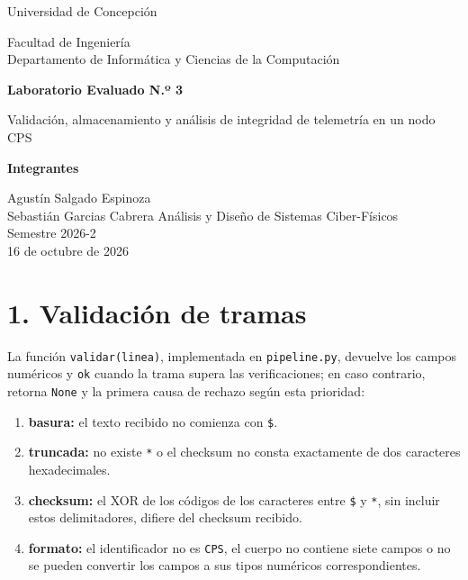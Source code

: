 \documentclass[
  11pt,
]{article}
\author{}
\date{}
\newcommand{\passthrough}[1]{#1}
\providecommand{\tightlist}{%
  \setlength{\itemsep}{0pt}\setlength{\parskip}{0pt}}
\begin{document}
\begin{titlepage}
\centering
{\large Universidad de Concepción\par}
\vspace{0.3cm}
Facultad de Ingeniería\\
Departamento de Informática y Ciencias de la Computación
\vspace{2.8cm}

{\LARGE\bfseries Laboratorio Evaluado N.º 3\par}
\vspace{0.8cm}
{\Large Validación, almacenamiento y análisis de integridad de telemetría en un nodo CPS\par}
\vspace{2.4cm}

{\large\bfseries Integrantes\par}
\vspace{0.4cm}
Agustín Salgado Espinoza\\[0.2cm]
Sebastián Garcias Cabrera
\vfill
Análisis y Diseño de Sistemas Ciber-Físicos\\
Semestre 2026-2\\[0.5cm]
16 de octubre de 2026
\end{titlepage}
\setcounter{page}{1}

\hypertarget{validaciuxf3n-de-tramas}{%
\section{1. Validación de tramas}\label{validaciuxf3n-de-tramas}}

La función \passthrough{\lstinline!validar(linea)!}, implementada en
\passthrough{\lstinline!pipeline.py!}, devuelve los campos numéricos y
\passthrough{\lstinline!ok!} cuando la trama supera las verificaciones;
en caso contrario, retorna \passthrough{\lstinline!None!} y la primera
causa de rechazo según esta prioridad:

\begin{enumerate}
\def\labelenumi{\arabic{enumi}.}
\tightlist
\item
  \textbf{basura:} el texto recibido no comienza con
  \passthrough{\lstinline!$!}.
\item
  \textbf{truncada:} no existe \passthrough{\lstinline!*!} o el checksum
  no consta exactamente de dos caracteres hexadecimales.
\item
  \textbf{checksum:} el XOR de los códigos de los caracteres entre
  \passthrough{\lstinline!$!} y \passthrough{\lstinline!*!}, sin incluir
  estos delimitadores, difiere del checksum recibido.
\item
  \textbf{formato:} el identificador no es
  \passthrough{\lstinline!CPS!}, el cuerpo no contiene siete campos o no
  se pueden convertir los campos a sus tipos numéricos correspondientes.
\end{enumerate}
\end{document}
